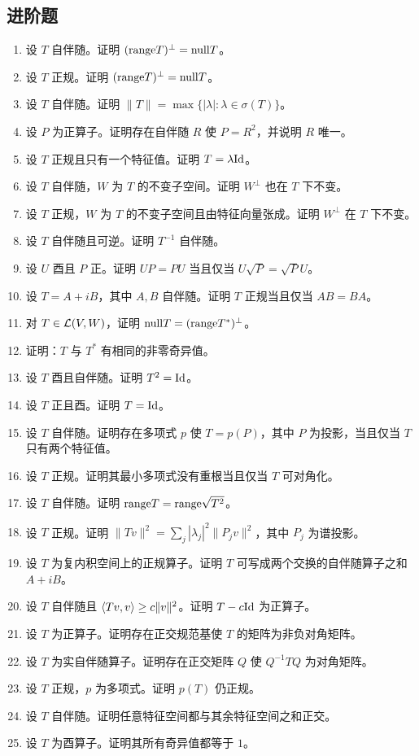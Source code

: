 \subsection*{进阶题}
\begin{enumerate}[resume, label=\textbf{\arabic*.}, leftmargin=*, itemsep=0.5em]
\item \medium 设 $T$ 自伴随。证明 $(\mathrm{range} T)^\perp=\mathrm{null} T$。
\item \medium 设 $T$ 正规。证明 $(\mathrm{range} T)^\perp=\mathrm{null} T$。
\item \medium 设 $T$ 自伴随。证明 $\|T\|=\max\{|\lambda|:\lambda\in\sigma(T)\}$。
\item \medium 设 $P$ 为正算子。证明存在自伴随 $R$ 使 $P=R^2$，并说明 $R$ 唯一。
\item \medium 设 $T$ 正规且只有一个特征值。证明 $T=\lambda\mathrm{Id}$。
\item \medium 设 $T$ 自伴随，$W$ 为 $T$ 的不变子空间。证明 $W^\perp$ 也在 $T$ 下不变。
\item \medium 设 $T$ 正规，$W$ 为 $T$ 的不变子空间且由特征向量张成。证明 $W^\perp$ 在 $T$ 下不变。
\item \medium 设 $T$ 自伴随且可逆。证明 $T^{-1}$ 自伴随。
\item \medium 设 $U$ 酉且 $P$ 正。证明 $UP=PU$ 当且仅当 $U\sqrt{P}=\sqrt{P}U$。
\item \medium 设 $T=A+iB$，其中 $A,B$ 自伴随。证明 $T$ 正规当且仅当 $AB=BA$。
\item \medium 对 $T\in\mathcal{L}(V,W)$，证明 $\mathrm{null} T=(\mathrm{range} T^*)^\perp$。
\item \medium 证明：$T$ 与 $T^*$ 有相同的非零奇异值。
\item \medium 设 $T$ 酉且自伴随。证明 $T^2=\mathrm{Id}$。
\item \medium 设 $T$ 正且酉。证明 $T=\mathrm{Id}$。
\item \medium 设 $T$ 自伴随。证明存在多项式 $p$ 使 $T=p(P)$，其中 $P$ 为投影，当且仅当 $T$ 只有两个特征值。
\item \medium 设 $T$ 正规。证明其最小多项式没有重根当且仅当 $T$ 可对角化。
\item \medium 设 $T$ 自伴随。证明 $\mathrm{range} T=\mathrm{range} \sqrt{T^2}$。
\item \medium 设 $T$ 正规。证明 $\|Tv\|^2=\sum_j |\lambda_j|^2\|P_jv\|^2$，其中 $P_j$ 为谱投影。
\item \medium 设 $T$ 为复内积空间上的正规算子。证明 $T$ 可写成两个交换的自伴随算子之和 $A+iB$。
\item \medium 设 $T$ 自伴随且 $\langle Tv, v \rangle\ge c\|v\|^2$。证明 $T-c\mathrm{Id}$ 为正算子。
\item \medium 设 $T$ 为正算子。证明存在正交规范基使 $T$ 的矩阵为非负对角矩阵。
\item \medium 设 $T$ 为实自伴随算子。证明存在正交矩阵 $Q$ 使 $Q^{-1}TQ$ 为对角矩阵。
\item \medium 设 $T$ 正规，$p$ 为多项式。证明 $p(T)$ 仍正规。
\item \medium 设 $T$ 自伴随。证明任意特征空间都与其余特征空间之和正交。
\item \medium 设 $T$ 为酉算子。证明其所有奇异值都等于 $1$。
\end{enumerate}

